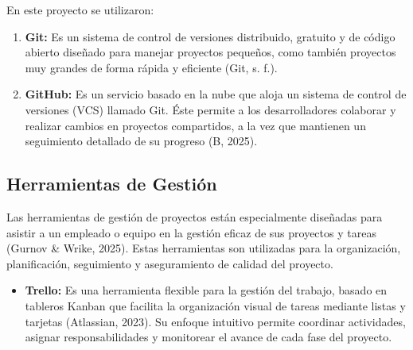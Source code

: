 En este proyecto se utilizaron:

\begin{enumerate}
    \item \textbf{Git:} Es un sistema de control de versiones distribuido,
    gratuito y de código abierto diseñado para manejar proyectos pequeños, como
    también proyectos muy grandes de forma rápida y eficiente (Git, s. f.).
    \item \textbf{GitHub:} Es un servicio basado en la nube que aloja un sistema
    de control de versiones (VCS) llamado Git. Éste permite a los
    desarrolladores colaborar y realizar cambios en proyectos compartidos, a la
    vez que mantienen un seguimiento detallado de su progreso (B, 2025).
\end{enumerate}

\subsection{Herramientas de Gestión}

Las herramientas de gestión de proyectos están especialmente diseñadas para
asistir a un empleado o equipo en la gestión eficaz de sus proyectos y tareas
(Gurnov \& Wrike, 2025). Estas herramientas son utilizadas para la
organización, planificación, seguimiento y aseguramiento de calidad del
proyecto.

\begin{itemize}
    \item \textbf{Trello:} Es una herramienta flexible para la gestión del
    trabajo, basado en tableros Kanban que facilita la organización visual de
    tareas mediante listas y tarjetas (Atlassian, 2023). Su enfoque intuitivo
    permite coordinar actividades, asignar responsabilidades y monitorear el
    avance de cada fase del proyecto.
\end{itemize}
